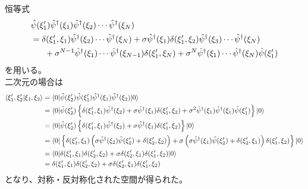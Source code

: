 \documentclass[dvipdfmx, 11pt, a4paper]{jsarticle}
\numberwithin{equation}{section}
\theoremstyle{definition}
\begin{document}
    \begin{derivationBox}
        恒等式
        \begin{align}
            &\hat{\psi}(\xi_1') \hat{\psi}^\dagger (\xi_1) \hat{\psi}^\dagger (\xi_2) \cdots \hat{\psi}^\dagger (\xi_N) \notag \\
            &= \delta(\xi_1',\xi_1) \hat{\psi}^\dagger (\xi_2) \cdots \hat{\psi}^\dagger (\xi_N) + \sigma \hat{\psi}^\dagger (\xi_1) \delta (\xi_1',\xi_2) \hat{\psi}^\dagger (\xi_3) \cdots \hat{\psi}^\dagger (\xi_N) \notag \\
            &\ \ \ \ \ + \sigma^{N-1} \hat{\psi}^\dagger (\xi_1) \cdots \hat{\psi}^\dagger (\xi_{N-1}) \delta (\xi_1',\xi_N) + \sigma^N \hat{\psi}^\dagger (\xi_1)\cdots \hat{\psi}^\dagger (\xi_N) \hat{\psi}(\xi_1') \label{koutou1} 
        \end{align}
        を用いる。\\
        二次元の場合は
        \begin{align}
            \langle \xi_1',\xi_2'|\xi_1,\xi_2 \rangle &= \langle 0| \hat{\psi}(\xi_2') \hat{\psi}(\xi_1') \hat{\psi}^\dagger (\xi_1) \hat{\psi}^\dagger (\xi_2) |0\rangle \notag \\
            &= \langle 0| \hat{\psi}(\xi_2') \left\{ \delta(\xi_1',\xi_1) \hat{\psi}^\dagger (\xi_2) + \sigma \hat{\psi}^\dagger (\xi_1) \delta (\xi_1',\xi_2) + \sigma^2 \hat{\psi}^\dagger (\xi_1) \hat{\psi}^\dagger (\xi_1) \hat{\psi} (\xi_1') \right\} |0\rangle \notag \\
            &= \langle 0| \hat{\psi}(\xi_2') \left\{ \delta(\xi_1',\xi_1) \hat{\psi}^\dagger (\xi_2) + \sigma \hat{\psi}^\dagger (\xi_1) \delta (\xi_1',\xi_2) \right\} |0\rangle \notag \\
            &= \langle 0| \left\{ \delta(\xi_1',\xi_1) \left( \sigma \hat{\psi}^\dagger (\xi_2) \hat{\psi}(\xi_2') + \delta (\xi_2',\xi_2)\right) + \sigma \left( \sigma \hat{\psi}^\dagger (\xi_1) \hat{\psi}(\xi_2') + \delta (\xi_2',\xi_1)\right) \delta (\xi_1',\xi_2) \right\} |0\rangle \notag \\
            &= \langle 0| \delta(\xi_1',\xi_1) \delta (\xi_2',\xi_2) + \sigma \delta (\xi_2',\xi_1) \delta (\xi_1',\xi_2)  |0\rangle \notag \\
            &= \delta(\xi_1',\xi_1) \delta (\xi_2',\xi_2) + \sigma \delta (\xi_2',\xi_1) \delta (\xi_1',\xi_2) 
        \end{align}
        となり、対称・反対称化された空間が得られた。
    \end{derivationBox}
\end{document}
